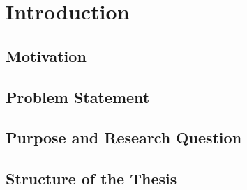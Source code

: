 \section*{Introduction}

\subsection{Motivation}
\label{sec:Motivation}


\subsection{Problem Statement}
\label{sec:Problem Statement}


\subsection{Purpose and Research Question}
\label{sec:Objective}


\subsection{Structure of the Thesis}
\label{sec:Structure of the Thesis}